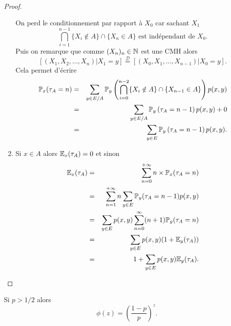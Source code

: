 \begin{proof}
\begin{enumerate}
$$     $$
     On perd le conditionnement par rapport à $X_0$ car sachant $X_1$
     $$
     \bigcap_{i = 1}^{n-1}\{X_i\notin A\}\cap\{X_n\in A\}\text{ est indépendant de } X_0.
     $$
     Puis on remarque que comme $(X_n)_n\in \mathbb{N}$ est une CMH alors
     $$
     [(X_1, X_2,\ldots, X_n)|X_1  =y]\overset{\mathcal{D}}{=}[(X_0, X_1,\ldots, X_{n-1})|X_0 = y].
     $$
     Cela permet d'écrire
    \begin{eqnarray*}
    \mathbb{P}_x(\tau_A=n)&=&\sum_{y\in E/A} \mathbb{P}_y\left(\bigcap_{i = 0}^{n-2}\{X_i\notin A\}\cap\{X_{n-1}\in A\}\right)p(x,y)\\
    &=&\sum_{y\in E/A} \mathbb{P}_y\left(\tau_A = n-1\right)p(x,y) + 0\\
    &=&\sum_{y\in E} \mathbb{P}_y\left(\tau_A = n-1\right)p(x,y).
    \end{eqnarray*}
    \item Si $x\in A$ alors $\mathbb{E}_x(\tau_A)=0$ et sinon
\begin{eqnarray*}
\mathbb{E}_x(\tau_A)&=&\sum_{n=0}^{+\infty}n\times\mathbb{P}_x(\tau_A=n)\\
&=&\sum_{n=1}^{+\infty}n\sum_{y\in E}\mathbb{P}_y(\tau_A=n-1)p(x,y)\\
&=&\sum_{y\in E}p(x,y)\sum_{n=0}^{\infty}(n+1)\mathbb{P}_y(\tau_A=n)\\
&=&\sum_{y\in E}p(x,y)(1+ \mathbb{E}_y(\tau_A))\\
&=&1+\sum_{y\in E}p(x,y)\mathbb{E}_y(\tau_A).
\end{eqnarray*}

\end{enumerate}
\end{proof}
\begin{theo}
Si $p>1/2$ alors 
$$
\phi(z) = \left(\frac{1-p}{p}\right)^z.
$$
\end{theo}


